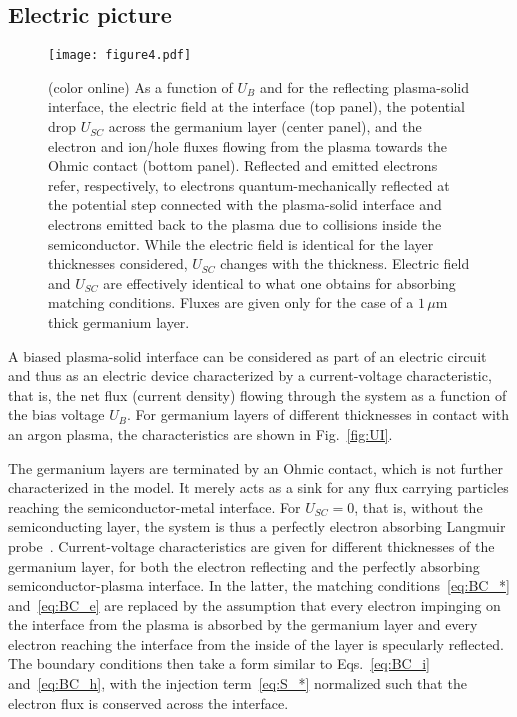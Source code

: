 \documentclass[pre,reprint,floats]{revtex4-1}
\begin{document}
\subsection{Electric picture}\label{sec:BP}

\begin{figure}[t]
\texttt{[image: figure4.pdf]}
\caption{(color online) As a function of $U_B$ and for the reflecting plasma-solid interface, 
the electric field at the interface (top panel), 
the potential drop $U_{SC}$ across the germanium layer (center panel), and the electron and 
ion/hole fluxes flowing from the plasma towards the Ohmic contact (bottom panel). Reflected 
and emitted electrons refer, respectively, to electrons quantum-mechanically reflected at 
the potential step connected with the plasma-solid interface and electrons emitted back to 
the plasma due to collisions inside the semiconductor. While the electric field is identical 
for the layer thicknesses considered, $U_{SC}$ changes with the thickness. Electric field 
and $U_{SC}$ are effectively identical to what one obtains for absorbing matching conditions. 
Fluxes are given only for the case of a $1\,\mu$m thick germanium layer.}
\label{fig:U-curves}
\end{figure}

A biased plasma-solid interface can be considered as part of an electric circuit and thus as an 
electric device characterized by a current-voltage characteristic, that is, the net flux  
(current density) flowing through the system as a function of the bias voltage $U_B$. For 
germanium layers of different thicknesses in contact with an argon plasma, the characteristics are 
shown in Fig.~\ref{fig:UI}. 

The germanium layers are terminated by an Ohmic contact, which is not 
further characterized in the model. It merely acts as a sink for any flux carrying particles 
reaching the semiconductor-metal interface. For $U_{SC}=0$, that is, without the semiconducting layer,
the system is thus a perfectly electron absorbing Langmuir probe~\cite{ML26, Cherrington82,Lam65}. 
Current-voltage characteristics are given for different thicknesses of the germanium layer, for both 
the electron reflecting and the perfectly absorbing semiconductor-plasma interface. In the latter, the 
matching conditions~\eqref{eq:BC_*} and~\eqref{eq:BC_e} are replaced by the assumption that every 
electron impinging on the interface from the plasma is absorbed by the germanium layer and every 
electron reaching the interface from the inside of the layer is specularly reflected. The 
boundary conditions then take a form similar to Eqs.~\eqref{eq:BC_i} and~\eqref{eq:BC_h}, with 
the injection term~\eqref{eq:S_*} normalized such that the electron flux is conserved across the 
interface. 
	
\end{document}
